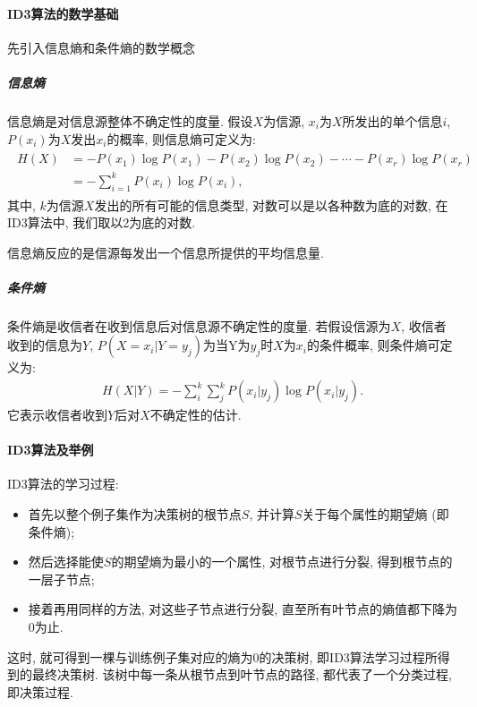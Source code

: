 \paragraph{ID3算法的数学基础}
先引入信息熵和条件熵的数学概念
\subparagraph{信息熵}
信息熵是对信息源整体不确定性的度量. 假设$X$为信源, $x_i$为$X$所发出的单个信息$i$, $P (x_i)$为$X$发出$x_i$的概率, 则信息熵可定义为:
\begin{align}
  \begin{aligned}
    H (X) &=-P\left (x_{1}\right) \log P\left (x_{1}\right)-P\left (x_{2}\right) \log P\left (x_{2}\right)-\cdots-P\left (x_{r}\right) \log P\left (x_{r}\right) \\
                       &=-\sum_{i=1}^{k} P\left (x_{i}\right) \log P\left (x_{i}\right),
  \end{aligned}
\end{align}
其中, $k$为信源$X$发出的所有可能的信息类型, 对数可以是以各种数为底的对数, 在ID3算法中, 我们取以2为底的对数.
\begin{remark}
 信息熵反应的是信源每发出一个信息所提供的平均信息量.
\end{remark}
\subparagraph{条件熵}
条件熵是收信者在收到信息后对信息源不确定性的度量.
若假设信源为$X$, 收信者收到的信息为$Y$, $P (X=x_i|Y=y_j)$为当Y为$y_j$时$X$为$x_i$的条件概率, 则条件熵可定义为:
\begin{align}
    H (X | Y)=-\sum_{i}^{k} \sum_{j}^{k} P\left (x_{i} | y_{j}\right) \log P\left (x_{i} | y_{j}\right).
\end{align}
它表示收信者收到$Y$后对$X$不确定性的估计.

\paragraph{ID3算法及举例} 
ID3算法的学习过程:
\begin{itemize}
\item 首先以整个例子集作为决策树的根节点$S$, 并计算$S$关于每个属性的期望熵 (即条件熵);
\item 然后选择能使$S$的期望熵为最小的一个属性, 对根节点进行分裂, 得到根节点的一层子节点;
\item 接着再用同样的方法, 对这些子节点进行分裂, 直至所有叶节点的熵值都下降为0为止.
\end{itemize}
\begin{remark}
    这时, 就可得到一棵与训练例子集对应的熵为0的决策树, 即ID3算法学习过程所得到的最终决策树. 该树中每一条从根节点到叶节点的路径, 都代表了一个分类过程, 即决策过程.
\end{remark}

